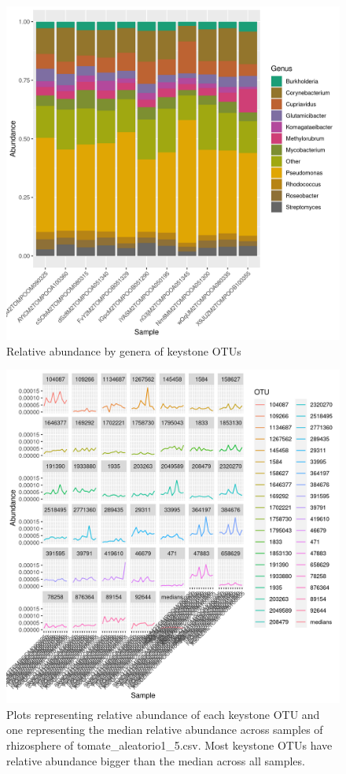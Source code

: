 \begin{figure}
\centering
\includegraphics[scale = 0.8]{tomate_aleatorio1_5.csv_relative_abundance_Genus.png}
\caption{Relative abundance by genera of keystone OTUs }
\label{fig:tomate_aleatorio1_5.csv_genus}
\end{figure}
\begin{figure}
   \centering
   \includegraphics[scale = 0.8]{abundance_tomate_aleatorio1_5.csv_key_otus_medians.png}
   \caption{Plots representing relative abundance of each keystone OTU and one representing the median relative abundance  across samples of rhizosphere of tomate_aleatorio1_5.csv. Most keystone OTUs have relative abundance bigger than the median across all samples.  }
   \label{key_otus_vs_medians_tomate_aleatorio1_5.csv}
\end{figure}
